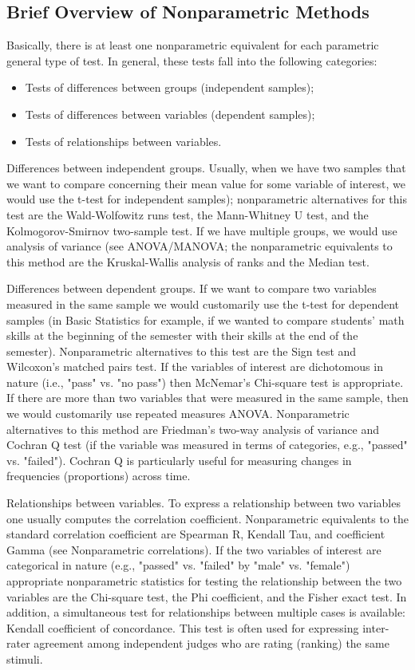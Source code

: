 \subsection{Brief Overview of Nonparametric Methods}

Basically, there is at least one nonparametric equivalent for each parametric general type of test. In general, these tests fall into the following categories:

\begin{itemize}
\item Tests of differences between groups (independent samples);
\item Tests of differences between variables (dependent samples);
\item Tests of relationships between variables.
\end{itemize}

Differences between independent groups. Usually, when we have two samples that we want to compare concerning their mean value for some variable of interest, we would use the t-test for independent samples); nonparametric alternatives for this test are the Wald-Wolfowitz runs test, the Mann-Whitney U test, and the Kolmogorov-Smirnov two-sample test. If we have multiple groups, we would use analysis of variance (see ANOVA/MANOVA; the nonparametric equivalents to this method are the Kruskal-Wallis analysis of ranks and the Median test.

Differences between dependent groups. If we want to compare two variables measured in the same sample we would customarily use the t-test for dependent samples (in Basic Statistics for example, if we wanted to compare students' math skills at the beginning of the semester with their skills at the end of the semester). Nonparametric alternatives to this test are the Sign test and Wilcoxon's matched pairs test. If the variables of interest are dichotomous in nature (i.e., "pass" vs. "no pass") then McNemar's Chi-square test is appropriate. If there are more than two variables that were measured in the same sample, then we would customarily use repeated measures ANOVA. Nonparametric alternatives to this method are Friedman's two-way analysis of variance and Cochran Q test (if the variable was measured in terms of categories, e.g., "passed" vs. "failed"). Cochran Q is particularly useful for measuring changes in frequencies (proportions) across time.

Relationships between variables. To express a relationship between two variables one usually computes the correlation coefficient. Nonparametric equivalents to the standard correlation coefficient are Spearman R, Kendall Tau, and coefficient Gamma (see Nonparametric correlations). If the two variables of interest are categorical in nature (e.g., "passed" vs. "failed" by "male" vs. "female") appropriate nonparametric statistics for testing the relationship between the two variables are the Chi-square test, the Phi coefficient, and the Fisher exact test. In addition, a simultaneous test for relationships between multiple cases is available: Kendall coefficient of concordance. This test is often used for expressing inter-rater agreement among independent judges who are rating (ranking) the same stimuli.

